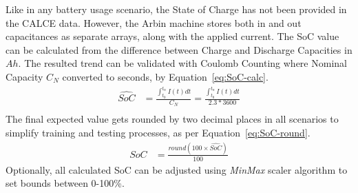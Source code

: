 %
Like in any battery usage scenario, the State of Charge has not been provided in the CALCE data.
However, the Arbin machine stores both in and out capacitances as separate arrays, along with the applied current.
The SoC value can be calculated from the difference between Charge and Discharge Capacities in $Ah$.
The resulted trend can be validated with Coulomb Counting where Nominal Capacity $C_{N}$ converted to seconds, by \mbox{Equation~\ref{eq:SoC-calc}}.
\begin{equation}
    \begin{split}
        \hat{SoC} &= \frac{\int_{t_0}^{t_n} I(t)dt} {C_{N}} = \frac{\int_{t_0}^{t_n} I(t)dt} {2.3*3600} \\
        \label{eq:SoC-calc}
    \end{split}
\end{equation}
The final expected value gets rounded by two decimal places in all scenarios to simplify training and testing processes, as per Equation~\ref{eq:SoC-round}.
\begin{equation}
    \begin{split}
        SoC &= \frac{round(100\times\hat{SoC})}{100}
        \label{eq:SoC-round}
    \end{split}
\end{equation}
Optionally, all calculated SoC can be adjusted using \textit{MinMax} scaler algorithm to set bounds between 0-100\%.
